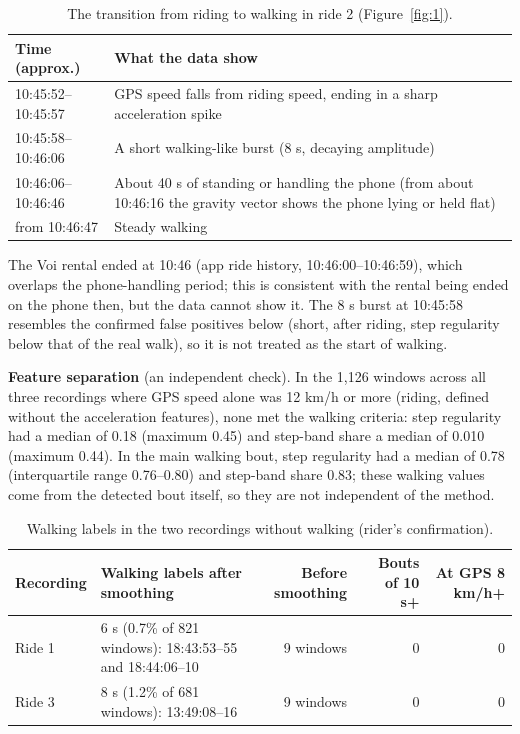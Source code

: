 \begin{table}[htbp]
\centering\small
\caption{The transition from riding to walking in ride 2 (Figure~\ref{fig:1}).}\label{tab:Btransition}
\begin{tabular}{@{}p{38mm}p{116mm}@{}}
\toprule
Time (approx.) & What the data show \\
\midrule
10:45:52--10:45:57 & GPS speed falls from riding speed, ending in a sharp acceleration spike \\
10:45:58--10:46:06 & A short walking-like burst (8 s, decaying amplitude) \\
10:46:06--10:46:46 & About 40 s of standing or handling the phone (from about 10:46:16 the gravity vector shows the phone lying or held flat) \\
from 10:46:47 & Steady walking \\
\bottomrule
\end{tabular}
\end{table}

The Voi rental ended at 10:46 (app ride history, 10:46:00--10:46:59), which overlaps the
phone-handling period; this is consistent with the rental being ended on the phone then,
but the data cannot show it. The 8 s burst at 10:45:58 resembles the confirmed false
positives below (short, after riding, step regularity below that of the real walk), so
it is not treated as the start of walking.

\textbf{Feature separation} (an independent check). In the 1,126 windows across all three
recordings where GPS speed alone was 12 km/h or more (riding, defined without the
acceleration features), none met the walking criteria: step regularity had a median of
0.18 (maximum 0.45) and step-band share a median of 0.010 (maximum 0.44). In the main
walking bout, step regularity had a median of 0.78 (interquartile range 0.76--0.80) and
step-band share 0.83; these walking values come from the detected bout itself, so they
are not independent of the method.

\begin{table}[htbp]
\centering\small
\caption{Walking labels in the two recordings without walking (rider's confirmation).}\label{tab:Bfp}
\begin{tabular}{@{}lp{52mm}rrr@{}}
\toprule
Recording & Walking labels after smoothing & Before smoothing & Bouts of 10 s+ & At GPS 8 km/h+ \\
\midrule
Ride 1 & 6 s (0.7\% of 821 windows): 18:43:53--55 and 18:44:06--10 & 9 windows & 0 & 0 \\
Ride 3 & 8 s (1.2\% of 681 windows): 13:49:08--16 & 9 windows & 0 & 0 \\
\bottomrule
\end{tabular}
\end{table}

